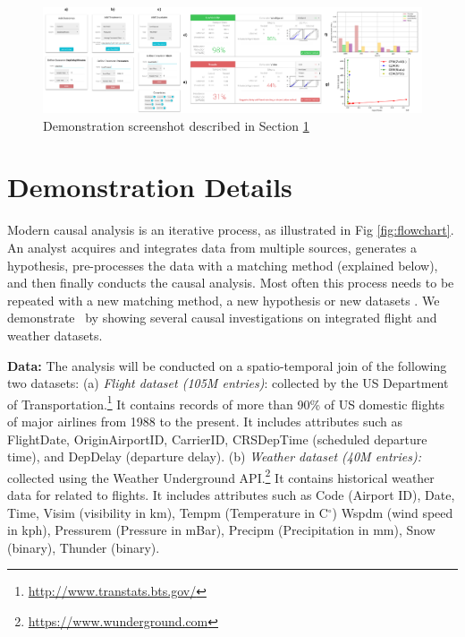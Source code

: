 \begin{figure}
\hspace*{-1.2cm}
\includegraphics[scale=0.155]{Figures/Demo-Tutorial-2.png}
\caption{Demonstration screenshot described in Section \ref{sec:dd}}
\label{sfig:demo-tutorial}
\end{figure}

\vspace{-.3cm}
\section{Demonstration Details}
\label{sec:dd}
Modern causal analysis is an iterative process, as  illustrated in Fig \ref{fig:flowchart}.
An analyst acquires and integrates data from multiple sources,
generates a hypothesis, pre-processes the data with a matching  method (explained below), and then finally
 conducts the causal analysis. Most often this process needs to be repeated with a new matching
  method, a new hypothesis or new datasets \cite{IacKinPor09}.
We demonstrate \GSQL\ by showing several causal investigations on integrated flight and weather datasets. 


    {\bf Data:} The analysis will be conducted on a spatio-temporal join of the following two datasets:
(a) {\it Flight dataset (105M entries)}: collected by the US
Department of Transportation.\footnote{\url{http://www.transtats.bts.gov/}} It contains
records of more than 90\% of US domestic flights of major airlines
from 1988 to the present. It includes attributes such as FlightDate, OriginAirportID,
CarrierID, CRSDepTime (scheduled departure time), and DepDelay (departure delay).
(b) {\it Weather dataset (40M entries):} collected using the Weather Underground API.\footnote{\url{https://www.wunderground.com}}
It contains historical weather data for related to flights. It includes attributes such as Code (Airport ID),
Date, Time,  Visim (visibility in km),
  Tempm (Temperature in C$^{\circ}$)
  Wspdm (wind speed in kph), Pressurem (Pressure in mBar), Precipm  (Precipitation in mm), Snow (binary), Thunder (binary).






